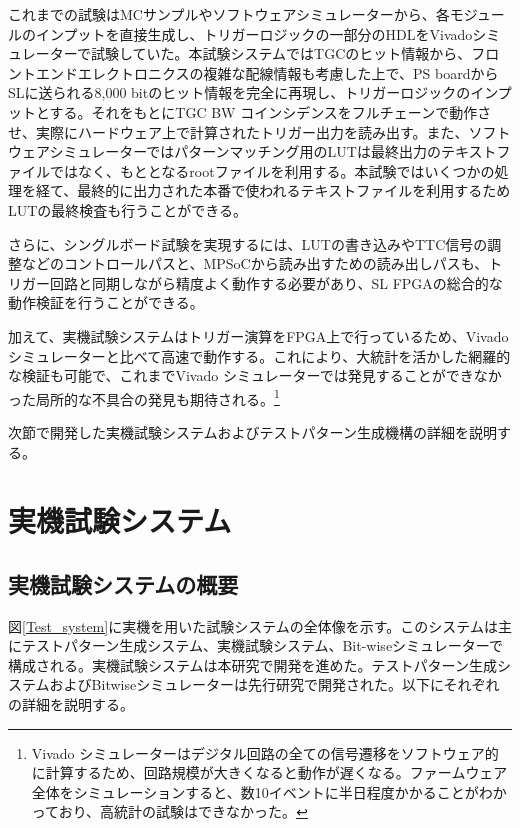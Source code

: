 これまでの試験はMCサンプルやソフトウェアシミュレーターから、各モジュールのインプットを直接生成し、トリガーロジックの一部分のHDLをVivadoシミュレーターで試験していた。本試験システムではTGCのヒット情報から、フロントエンドエレクトロニクスの複雑な配線情報も考慮した上で、PS boardからSLに送られる8,000 bitのヒット情報を完全に再現し、トリガーロジックのインプットとする。それをもとにTGC BW コインシデンスをフルチェーンで動作させ、実際にハードウェア上で計算されたトリガー出力を読み出す。また、ソフトウェアシミュレーターではパターンマッチング用のLUTは最終出力のテキストファイルではなく、もととなるrootファイルを利用する。本試験ではいくつかの処理を経て、最終的に出力された本番で使われるテキストファイルを利用するためLUTの最終検査も行うことができる。

さらに、シングルボード試験を実現するには、LUTの書き込みやTTC信号の調整などのコントロールパスと、MPSoCから読み出すための読み出しパスも、トリガー回路と同期しながら精度よく動作する必要があり、SL FPGAの総合的な動作検証を行うことができる。

加えて、実機試験システムはトリガー演算をFPGA上で行っているため、Vivado シミュレーターと比べて高速で動作する。これにより、大統計を活かした網羅的な検証も可能で、これまでVivado シミュレーターでは発見することができなかった局所的な不具合の発見も期待される。\footnote{Vivado シミュレーターはデジタル回路の全ての信号遷移をソフトウェア的に計算するため、回路規模が大きくなると動作が遅くなる。ファームウェア全体をシミュレーションすると、数10イベントに半日程度かかることがわかっており、高統計の試験はできなかった。}

次節で開発した実機試験システムおよびテストパターン生成機構の詳細を説明する。

\section{実機試験システム}

\subsection{実機試験システムの概要}
\label{subsec_TestSystemOverview}
図\ref{Test_system}に実機を用いた試験システムの全体像を示す。このシステムは主にテストパターン生成システム、実機試験システム、Bit-wiseシミュレーターで構成される。実機試験システムは本研究で開発を進めた。テストパターン生成システムおよびBitwiseシミュレーターは先行研究で開発された。以下にそれぞれの詳細を説明する。

